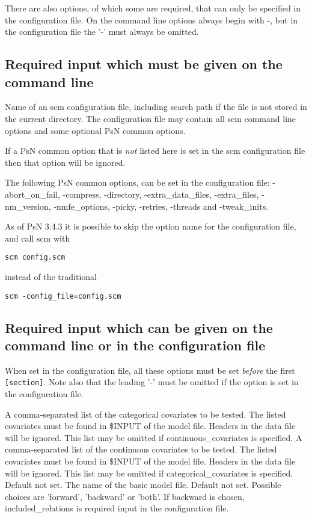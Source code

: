 There are also options, of which some are required, that can only be specified in the configuration file. On the command line options always begin with -, but in the configuration file the '-' must always be omitted.

\subsection{Required input which must be given on the command line}
\begin{optionlist}
Name of an scm configuration file, including search path if the file is not stored in the current directory. The configuration file may contain all scm command line options and some optional PsN common options.

If a PsN common option that is \emph{not} listed here is set in the scm configuration file then that option will be ignored.

The following PsN common options, can be set in the configuration file: \mbox{-abort\_on\_fail}, \mbox{-compress}, \mbox{-directory}, \mbox{-extra\_data\_files}, \mbox{-extra\_files}, \mbox{-nm\_version}, \mbox{-nmfe\_options}, \mbox{-picky}, \mbox{-retries}, \mbox{-threads} and \mbox{-tweak\_inits}. 
\nextopt
\end{optionlist}
As of PsN 3.4.3 it is possible to skip the option name for the configuration file, and call scm with
\begin{verbatim}
scm config.scm 
\end{verbatim}
instead of the traditional
\begin{verbatim}
scm -config_file=config.scm
\end{verbatim}

\subsection{Required input which can be given on the\\ command line or in the configuration file}
When set in the configuration file, all these options must be set \emph{before} the first  \verb|[section]|. Note also that the leading '-' must be omitted if the option is set in the configuration file.
\begin{optionlist}
A comma-separated list of the categorical covariates to be tested. The listed covariates must be found in \$INPUT of the model file. Headers in the data file will be ignored. This list may be omitted if continuous\_covariates is specified. 
\nextopt
{}
A comma-separated list of the continuous covariates to be tested. The listed covariates must be found in \$INPUT of the model file. Headers in the data file will be ignored. This list may be omitted if categorical\_covariates is specified. 
\nextopt
{}
Default not set. The name of the basic model file. 
\nextopt
{}
Default not set. Possible choices are 'forward', 'backward' or 'both'. If backward is chosen, included\_relations is required input in the configuration file. 
\nextopt
\end{optionlist}

